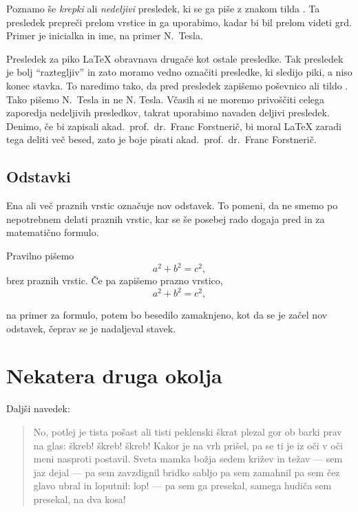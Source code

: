 \documentclass[a4paper]{article}
\begin{document}
Poznamo še \emph{krepki} ali \emph{nedeljivi} presledek, ki se ga piše z znakom tilda
\texttt{}. Ta presledek prepreči prelom vrstice in ga uporabimo, kadar bi bil
prelom videti grd. Primer je inicialka in ime, na primer N.~Tesla.

Presledek za piko {\LaTeX} obravnava drugače kot ostale presledke. Tak presledek je bolj
``raztegljiv'' in zato moramo vedno označiti presledke, ki sledijo piki, a niso konec
stavka. To naredimo tako, da pred presledek zapišemo poševnico \texttt{} ali tildo
\texttt{}. Tako pišemo N.~Tesla in ne N. Tesla. Včasih si ne moremo privoščiti
celega zaporedja nedeljivih presledkov, takrat uporabimo navaden deljivi presledek.
Denimo, če bi zapisali akad.~prof.~dr.~Franc Forstnerič, bi moral {\LaTeX} zaradi tega
deliti več besed, zato je boje pisati akad.\ prof.\ dr.~Franc Forstnerič.






\subsection{Odstavki}

Ena ali več praznih vrstic označuje nov odstavek. To pomeni, da ne smemo po nepotrebnem
delati praznih vrstic, kar se še posebej rado dogaja pred in za matematično formulo.

Pravilno pišemo
\[
   a^2 + b^2 = c^2,
\]
brez praznih vrstic. Če pa zapišemo prazno vrstico,
\[
   a^2 + b^2 = c^2,
\]

na primer za formulo, potem bo besedilo zamaknjeno, kot da se je začel nov odstavek,
čeprav se je nadaljeval stavek.



\section{Nekatera druga okolja}

Daljši navedek:
%
\begin{quote}
  No, potlej je tista pošast ali tisti peklenski škrat plezal gor ob barki prav na glas:
  škreb! škreb! škreb! Kakor je na vrh prišel, pa se ti je iz oči v oči meni nasproti
  postavil. Sveta mamka božja sedem križev in težav --- sem jaz dejal --- pa sem zavzdignil
  bridko sabljo pa sem zamahnil pa sem čez glavo ubral in loputnil: lop! --- pa sem ga
  presekal, samega hudiča sem presekal, na dva kosa!
\end{quote}
\end{document}
